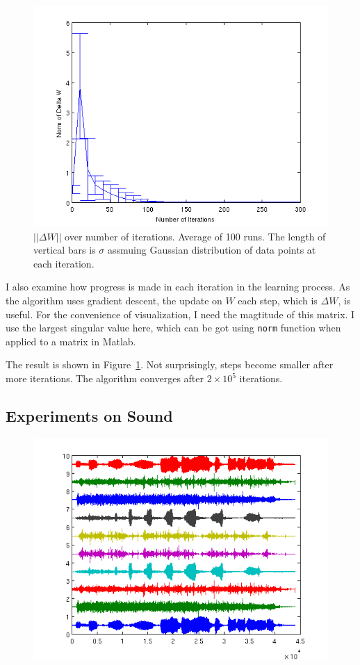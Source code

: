 \documentclass[10pt]{article}
\begin{document}
\begin{figure}[h]
\centering
\includegraphics[width=.6\textwidth]{detW.png}
\caption{$||\Delta W||$ over number of iterations. Average of 100 runs. The
length of vertical bars is $\sigma$ assmuing Gaussian distribution of data
points at each iteration.}
\label{fig:detW}
\end{figure}

I also examine how progress is made in each iteration in the learning
process. As the algorithm uses gradient descent, the update on $W$ each
step, which is $\Delta W$, is useful. For the convenience of visualization,
I need the magtitude of this matrix. I use the largest singular value here,
which can be got using \texttt{norm} function when applied to a matrix in
Matlab.

The result is shown in Figure~\ref{fig:detW}. Not surprisingly, steps
become smaller after more iterations. The algorithm converges after $2
\times 10^5$ iterations.

\subsection{Experiments on Sound}

\begin{figure}[h]
\centering
\includegraphics[width=.8\textwidth]{soundfull.png}
\caption{}
\label{fig:sound}
\end{figure}
\end{document}
